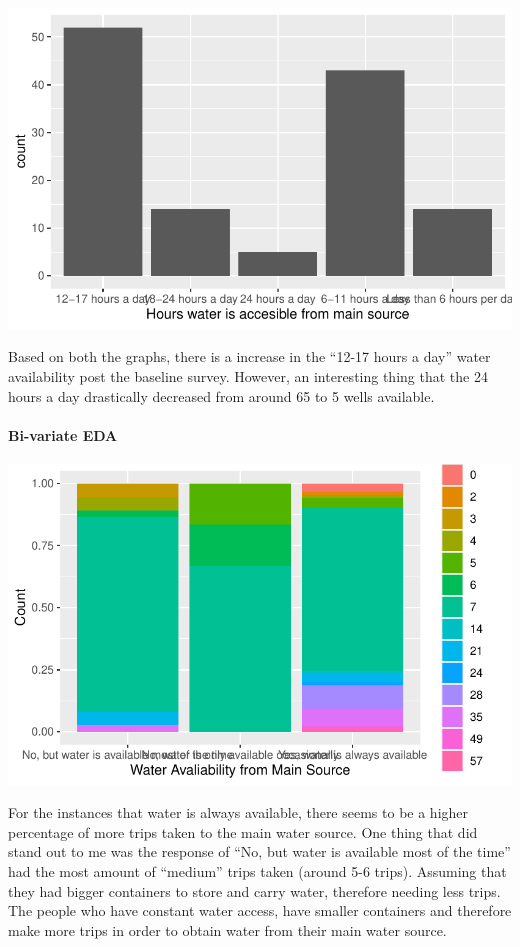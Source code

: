 \documentclass[
  letterpaper,
  DIV=11,
  numbers=noendperiod]{scrartcl}
\let\oldparagraph\paragraph
\renewcommand{\paragraph}[1]{\oldparagraph{#1}\mbox{}}
\begin{document}
\includegraphics{report_files/figure-pdf/unnamed-chunk-12-1.pdf}

Based on both the graphs, there is a increase in the ``12-17 hours a
day'' water availability post the baseline survey. However, an
interesting thing that the 24 hours a day drastically decreased from
around 65 to 5 wells available.

\hypertarget{bi-variate-eda}{%
\paragraph{Bi-variate EDA}\label{bi-variate-eda}}

\includegraphics{report_files/figure-pdf/unnamed-chunk-13-1.pdf}

For the instances that water is always available, there seems to be a
higher percentage of more trips taken to the main water source. One
thing that did stand out to me was the response of ``No, but water is
available most of the time'' had the most amount of ``medium'' trips
taken (around 5-6 trips). Assuming that they had bigger containers to
store and carry water, therefore needing less trips. The people who have
constant water access, have smaller containers and therefore make more
trips in order to obtain water from their main water source.
\end{document}
